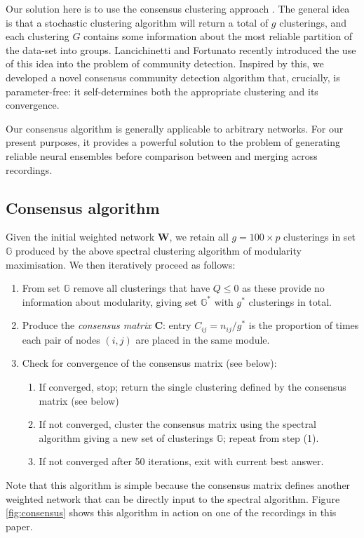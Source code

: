 \documentclass[11pt,a4paper]{article}
\begin{document}
Our solution here is to use the consensus clustering approach \citep{Monti2003,Nguyen2007}. The general idea is that a stochastic clustering algorithm will return a total of $g$ clusterings, and each clustering $G$ contains some information about the most reliable partition of the data-set into groups. Lancichinetti and Fortunato \citep{Lancichinetti2012} recently introduced the use of this idea into the problem of community detection. Inspired by this, we developed a novel consensus community detection algorithm that, crucially, is parameter-free: it self-determines both the appropriate clustering and its convergence.

Our consensus algorithm is generally applicable to arbitrary networks. For our present purposes, it provides a powerful solution to the problem of generating reliable neural ensembles before comparison between and merging across recordings.

\subsection{Consensus algorithm}
Given the initial weighted network $\mathbf{W}$, we retain all $g = 100 \times p$ clusterings in set $\mathbb{G}$ produced by the above spectral clustering algorithm of modularity maximisation. We then iteratively proceed as follows:
\begin{enumerate}
    \item From set $\mathbb{G}$ remove all clusterings that have $Q \leq 0$ as these provide no information about modularity, giving set $\mathbb{G}^*$ with $g^*$ clusterings in total.
    \item Produce the {\em consensus matrix} $\mathbf{C}$: entry $C_{ij} = n_{ij} / g^*$ is the proportion of times each pair of nodes $(i,j)$ are placed in the same module.
    \item Check for convergence of the consensus matrix (see below):
        \begin{enumerate}
            \item If converged, stop; return the single clustering defined by the consensus matrix (see below)
            \item If not converged, cluster the consensus matrix using the spectral algorithm giving a new set of clusterings $\mathbb{G}$; repeat from step (1).
            \item If not converged after 50 iterations, exit with current best answer.
        \end{enumerate}
\end{enumerate}
Note that this algorithm is simple because the consensus matrix defines another weighted network that can be directly input to the spectral algorithm. Figure \ref{fig:consensus} shows this algorithm in action on one of the recordings in this paper.
\end{document}
